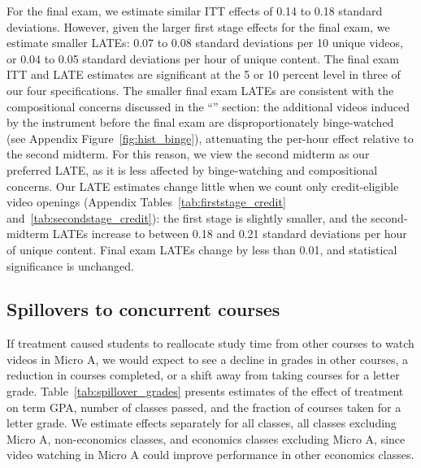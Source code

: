 
For the final exam, we estimate similar ITT effects of 0.14 to 0.18 standard deviations.
However, given the larger first stage effects for the final exam, we estimate smaller LATEs: 0.07 to 0.08 standard deviations per 10 unique videos, or 0.04 to 0.05 standard deviations per hour of unique content.
The final exam ITT and LATE estimates are significant at the 5 or 10 percent level in three of our four specifications.
The smaller final exam LATEs are consistent with the compositional concerns discussed in the ``'' section: the additional videos induced by the instrument before the final exam are disproportionately binge-watched (see Appendix Figure~\ref{fig:hist_binge}), attenuating the per-hour effect relative to the second midterm.
For this reason, we view the second midterm as our preferred LATE, as it is less affected by binge-watching and compositional concerns.
Our LATE estimates change little when we count only credit-eligible video openings (Appendix Tables~\ref{tab:firststage_credit} and~\ref{tab:secondstage_credit}): the first stage is slightly smaller, and the second-midterm LATEs increase to between 0.18 and 0.21 standard deviations per hour of unique content.
Final exam LATEs change by less than 0.01, and statistical significance is unchanged.

\subsection{Spillovers to concurrent courses}\label{subsec:spillovers}

If treatment caused students to reallocate study time from other courses to watch videos in Micro A, we would expect to see a decline in grades in other courses, a reduction in courses completed, or a shift away from taking courses for a letter grade.
Table~\ref{tab:spillover_grades} presents estimates of the effect of treatment on term GPA, number of classes passed, and the fraction of courses taken for a letter grade.
We estimate effects separately for all classes, all classes excluding Micro A, non-economics classes, and economics classes excluding Micro A, since video watching in Micro A could improve performance in other economics classes.


